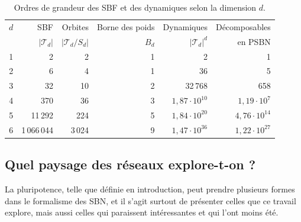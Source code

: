 \documentclass[12pt, a4paper]{article}
\begin{document}
\begin{table}[htbp]
\centering
\caption{Ordres de grandeur des SBF et des dynamiques selon la dimension $d$.}
\label{tab:echelles}
\begin{tabular}{rrrrrr}
\toprule
$d$ & SBF & Orbites & Borne des poids & Dynamiques & Décomposables \\
 & $|\mathcal{T}_d|$ & $|\mathcal{T}_d/S_d|$ & $B_d$ & $|\mathcal{T}_d|^d$ & en PSBN \\
\midrule
1 & 2 & 2 & 1 & 2 & 1 \\
2 & 6 & 4 & 1 & 36 & 5 \\
3 & 32 & 10 & 2 & 32\,768 & 658 \\
4 & 370 & 36 & 3 & $1{,}87 \cdot 10^{10}$ & $1{,}19 \cdot 10^{7}$ \\
5 & 11\,292 & 224 & 5 & $1{,}84 \cdot 10^{20}$ & $4{,}76 \cdot 10^{14}$ \\
6 & 1\,066\,044 & 3\,024 & 9 & $1{,}47 \cdot 10^{36}$ & $1{,}22 \cdot 10^{27}$ \\
\bottomrule
\end{tabular}
\end{table}

\subsection{Quel paysage des réseaux explore-t-on ?}
\label{sec:paysage}

La pluripotence, telle que définie en introduction, peut prendre plusieurs formes dans le formalisme des SBN, et il s'agit surtout de présenter celles que ce travail explore, mais aussi celles qui paraissent intéressantes et qui l'ont moins été.
\end{document}
